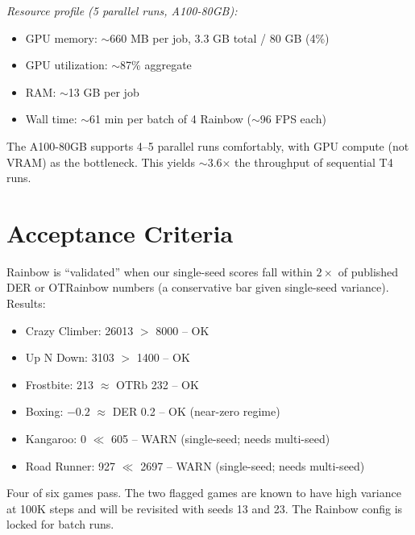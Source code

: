 \documentclass[11pt]{article}
\newcommand{\ok}{\textcolor{green!60!black}{OK}}
\newcommand{\warn}{\textcolor{orange!80!black}{WARN}}
\begin{document}
\noindent\textit{Resource profile (5 parallel runs, A100-80GB):}
\begin{itemize}[leftmargin=2em, itemsep=0.1em]
  \item GPU memory: $\sim$660 MB per job, 3.3 GB total / 80 GB (4\%)
  \item GPU utilization: $\sim$87\% aggregate
  \item RAM: $\sim$13 GB per job
  \item Wall time: $\sim$61 min per batch of 4 Rainbow ($\sim$96 FPS each)
\end{itemize}

\noindent The A100-80GB supports 4--5 parallel runs comfortably,
with GPU compute (not VRAM) as the bottleneck. This yields
$\sim$3.6$\times$ the throughput of sequential T4 runs.

\section{Acceptance Criteria}
\label{sec:acceptance}

Rainbow is ``validated'' when our single-seed scores fall within
$2\times$ of published DER or OTRainbow numbers (a conservative bar
given single-seed variance). Results:

\begin{itemize}[leftmargin=2em, itemsep=0.3em]
  \item Crazy Climber: 26013 $>$ 8000 -- \ok
  \item Up N Down: 3103 $>$ 1400 -- \ok
  \item Frostbite: 213 $\approx$ OTRb 232 -- \ok
  \item Boxing: $-0.2$ $\approx$ DER 0.2 -- \ok{} (near-zero regime)
  \item Kangaroo: 0 $\ll$ 605 -- \warn{} (single-seed; needs multi-seed)
  \item Road Runner: 927 $\ll$ 2697 -- \warn{} (single-seed; needs multi-seed)
\end{itemize}

Four of six games pass. The two flagged games are known to have high
variance at 100K steps and will be revisited with seeds 13 and 23.
The Rainbow config is locked for batch runs.
\end{document}
